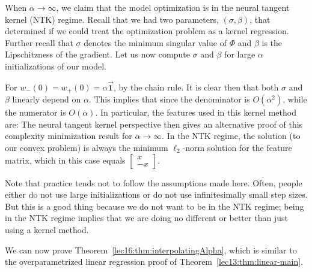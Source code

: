 \begin{remark}
When $\alpha \to \infty$, we claim that the model optimization is in the neural tangent kernel (NTK) regime.  Recall that we had two parameters, $(\sigma, \beta)$, that determined if we could treat the optimization problem as a kernel regression. Further recall that $\sigma$ denotes the minimum singular value of $\Phi$ and $\beta$ is the Lipschitzness of the gradient. Let us now compute $\sigma$ and $\beta$ for large $\alpha$ initializations of our model.

For $w_-(0) = w_+(0) = \alpha \vec{\mathbf{1}}$,
by the chain rule.  It is clear then that both $\sigma$ and $\beta$ linearly depend on $\alpha$.  This implies that
since the denominator is $O(\alpha^2)$, while the numerator is $O(\alpha)$.  In particular, the features used in this kernel method are:
The neural tangent kernel perspective then gives an alternative proof of this complexity minimization result for $\alpha \to \infty$. In the NTK regime, the solution (to our convex problem) is always the minimum $\ell_2$-norm solution for the feature matrix, which in this case equals $\begin{bmatrix} x \\ - x \end{bmatrix}$. 

Note that practice tends not to follow the assumptions made here. Often, people either do not use large initializations or do not use infinitesimally small step sizes. But this is a good thing  because we do not want to be in the NTK regime; being in the NTK regime implies that we are doing no different or better than just using a kernel method.
\end{remark}

We can now prove Theorem~\ref{lec16:thm:interpolatingAlpha}, which is similar to the overparametrized linear regression proof of Theorem~\ref{lec13:thm:linear-main}.

